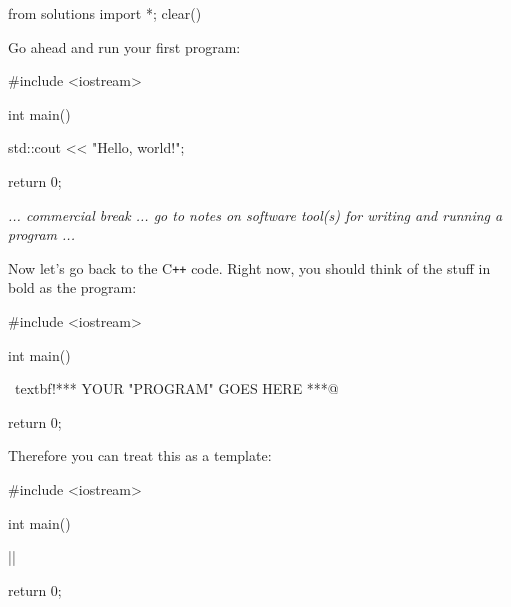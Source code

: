 \begin{python0}
from solutions import *; clear()
\end{python0}

Go ahead and run your first program:
\begin{console}
#include <iostream>

int main()
{
    std::cout << "Hello, world!\n";

    return 0;
}
\end{console}

\textit{ ... commercial break ... go to notes on software tool(s)
  for writing and running a program ...}

Now let's go back to the C\texttt{++} code.
Right now, you should think of the stuff in bold as the program:
\begin{console}[commandchars=\~\!\@]
#include <iostream>

int main()
{
    ~textbf!*** YOUR "PROGRAM" GOES HERE ***@

    return 0;
}
\end{console}

Therefore you can treat this as a template:
\begin{consolethree}[escapeinside=||]
#include <iostream>

int main()
{
                ||

    return 0;
}
\end{consolethree}




